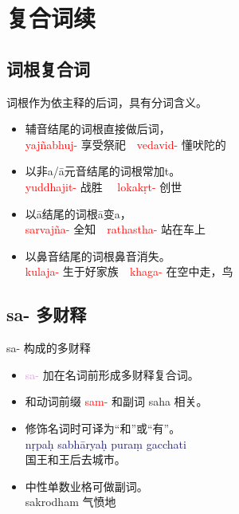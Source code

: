 \documentclass[17pt]{beamer}
\newcommand{\nounstem}[1]{\textcolor{red}{#1\nobreakdash-}}
\newcommand{\fullpada}[1]{\textcolor{OliveGreen}{#1}}
\newcommand{\pratyaya}[1]{\textcolor{Plum}{#1}}
\newcommand{\fullsentence}[1]{\textcolor{MidnightBlue}{#1}}
\begin{document}
\section{复合词续}
\begin{frame}{\insertsection}
  \small
  \tableofcontents[currentsection]
\end{frame}

\subsection{词根复合词}
\begin{frame}{\insertsubsection}
  \small 
  词根作为依主释的后词，具有分词含义。
  \begin{itemize}
    \item 辅音结尾的词根直接做后词，\\
    \nounstem{yajñabhuj} 享受祭祀~~\nounstem{vedavid} 懂吠陀的 \\
    \item 以非a/ā元音结尾的词根常加t。\\
    \nounstem{yuddhajit} 战胜~~ \nounstem{lokakṛt} 创世 \\

    \item 以ā结尾的词根ā变a，\\
    \nounstem{sarvajña} 全知~~\nounstem{rathastha} 站在车上 \\
    \item 以鼻音结尾的词根鼻音消失。\\
    \nounstem{kulaja} 生于好家族~~\nounstem{khaga} 在空中走，鸟\\
  \end{itemize}
\end{frame}

\subsection{sa- 多财释}
\begin{frame}{sa- 构成的多财释}
  \small 
  \begin{itemize}
    \item \pratyaya{sa\nobreakdash-} 加在名词前形成多财释复合词。
    \item 和动词前缀 \nounstem{sam} 和副词 \fullpada{saha} 相关。\\
    \item 修饰名词时可译为“和”或“有”。\\
    \fullsentence{nṛpaḥ sabhāryaḥ puraṃ gacchati} \\
    国王和王后去城市。\\
    \item 中性单数业格可做副词。\\
    \fullpada{sakrodham} 气愤地\\
  \end{itemize}
\end{frame}
\end{document}
